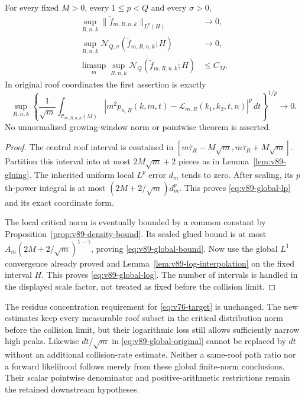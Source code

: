 \begin{theorem}
\label{thm:v89-diffusive}
For every fixed $M>0$, every $1\le p<Q$ and every $\sigma>0$,
\begin{align}
 \sup_{R,n,k}\|\widetilde f_{m,R,n,k}\|_{L^p(H)}
                                      &\longrightarrow0,
                                     \label{eq:v89-global-lp}\\
 \sup_{R,n,k}\mathcal N_{Q,\sigma}
                (\widetilde f_{m,R,n,k};H)&\longrightarrow0,
                                     \label{eq:v89-global-log}\\
 \limsup_m\sup_{R,n,k}\mathcal N_Q
                (\widetilde f_{m,R,n,k};H)&\le C_M.
                                     \label{eq:v89-global-bound}
\end{align}
In original roof coordinates the first assertion is exactly
\begin{equation}\label{eq:v89-global-original}
 \sup_{R,n,k}\left\{\frac1{\sqrt m}
  \int_{\mathcal C_{m,R,n,k}(M)}
       |m^2p_{n,R}(k,m,t)-\mathcal L_{m,R}(k_1,k_2,t,n)|^p\,dt
                         \right\}^{1/p}\longrightarrow0.
\end{equation}
No unnormalized growing-window norm or pointwise theorem is asserted.
\end{theorem}
\begin{proof}
The central roof interval is contained in
$[m\bar\tau_R-M\sqrt m,m\bar\tau_R+M\sqrt m]$.
Partition this interval into at most $2M\sqrt m+2$ pieces as in
Lemma~\ref{lem:v89-gluing}. The inherited uniform local $L^p$
error $d_m$ tends to zero. After scaling, its $p$th-power integral
is at most $(2M+2/\sqrt m)d_m^p$. This proves
\eqref{eq:v89-global-lp} and its exact coordinate form.

The local critical norm is eventually bounded by a common constant
by Proposition~\ref{prop:v89-density-bound}. Its scaled glued bound
is at most $A_m(2M+2/\sqrt m)^{1-\gamma}$, proving
\eqref{eq:v89-global-bound}. Now use the global $L^1$ convergence
already proved and Lemma~\ref{lem:v89-log-interpolation} on the fixed
interval $H$. This proves \eqref{eq:v89-global-log}.
The number of intervals is handled in the displayed scale factor,
not treated as fixed before the collision limit.
\end{proof}

The residue concentration requirement for
\eqref{eq:v76-target} is unchanged. The new estimates keep every
measurable roof subset in the critical distribution norm before the
collision limit, but their logarithmic loss still allows sufficiently
narrow high peaks. Likewise $dt/\sqrt m$ in
\eqref{eq:v89-global-original} cannot be replaced by $dt$ without
an additional collision-rate estimate. Neither a same-roof path ratio
nor a forward likelihood follows merely from these global finite-norm
conclusions. Their scalar pointwise denominator and positive-arithmetic
restrictions remain the retained downstream hypotheses.
